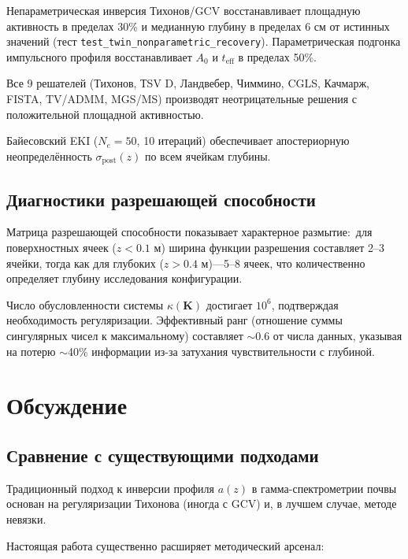 \documentclass[12pt,a4paper]{article}
\newcommand{\mK}{\mathbf{K}}
\begin{document}
Непараметрическая инверсия Тихонов/GCV восстанавливает
площадную активность в пределах 30\% и медианную глубину
в пределах 6 см от истинных значений (тест \texttt{test\_twin\_nonparametric\_recovery}).
Параметрическая подгонка импульсного профиля восстанавливает
$A_0$ и $t_{\mathrm{eff}}$ в пределах 50\%.

Все 9 решателей (Тихонов, ТSV D, Ландвебер, Чиммино,
CGLS, Качмарж, FISTA, TV/ADMM, MGS/MS) производят
неотрицательные решения с положительной площадной активностью.

Байесовский EKI ($N_e = 50$, 10 итераций) обеспечивает
апостериорную неопределённость $\sigma_{\mathrm{post}}(z)$
по всем ячейкам глубины.

\subsection{Диагностики разрешающей способности}
\label{sub:diag_results}

Матрица разрешающей способности показывает характерное
размытие:\ для поверхностных ячеек ($z < 0.1$ м) ширина
функции разрешения составляет 2--3 ячейки, тогда как для
глубоких ($z > 0.4$ м)---5--8 ячеек, что количественно
определяет глубину исследования конфигурации.

Число обусловленности системы $\kappa(\mK)$ достигает $10^6$,
подтверждая необходимость регуляризации.
Эффективный ранг (отношение суммы сингулярных чисел
к максимальному) составляет $\sim$0.6 от числа данных,
указывая на потерю $\sim$40\% информации из-за
затухания чувствительности с глубиной.


\section{Обсуждение}
\label{sec:discussion}

\subsection{Сравнение с существующими подходами}
\label{sub:comparison}

Традиционный подход к инверсии профиля $a(z)$
в гамма-спектрометрии почвы~\citep{Beck1968, Zombori1992, Tyler2008,
Hasan2022, Hasan2023} основан на регуляризации Тихонова
(иногда с GCV) и, в лучшем случае, методе невязки.

Настоящая работа существенно расширяет методический арсенал:
\end{document}
